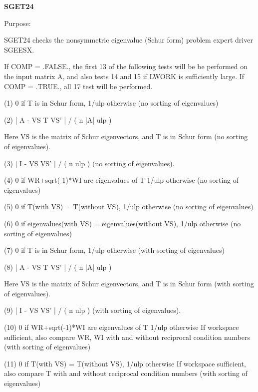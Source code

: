 {\bfseries S\+G\+E\+T24} 

\begin{DoxyParagraph}{Purpose\+: }
\begin{DoxyVerb}    SGET24 checks the nonsymmetric eigenvalue (Schur form) problem
    expert driver SGEESX.

    If COMP = .FALSE., the first 13 of the following tests will be
    be performed on the input matrix A, and also tests 14 and 15
    if LWORK is sufficiently large.
    If COMP = .TRUE., all 17 test will be performed.

    (1)     0 if T is in Schur form, 1/ulp otherwise
           (no sorting of eigenvalues)

    (2)     | A - VS T VS' | / ( n |A| ulp )

      Here VS is the matrix of Schur eigenvectors, and T is in Schur
      form  (no sorting of eigenvalues).

    (3)     | I - VS VS' | / ( n ulp ) (no sorting of eigenvalues).

    (4)     0     if WR+sqrt(-1)*WI are eigenvalues of T
            1/ulp otherwise
            (no sorting of eigenvalues)

    (5)     0     if T(with VS) = T(without VS),
            1/ulp otherwise
            (no sorting of eigenvalues)

    (6)     0     if eigenvalues(with VS) = eigenvalues(without VS),
            1/ulp otherwise
            (no sorting of eigenvalues)

    (7)     0 if T is in Schur form, 1/ulp otherwise
            (with sorting of eigenvalues)

    (8)     | A - VS T VS' | / ( n |A| ulp )

      Here VS is the matrix of Schur eigenvectors, and T is in Schur
      form  (with sorting of eigenvalues).

    (9)     | I - VS VS' | / ( n ulp ) (with sorting of eigenvalues).

    (10)    0     if WR+sqrt(-1)*WI are eigenvalues of T
            1/ulp otherwise
            If workspace sufficient, also compare WR, WI with and
            without reciprocal condition numbers
            (with sorting of eigenvalues)

    (11)    0     if T(with VS) = T(without VS),
            1/ulp otherwise
            If workspace sufficient, also compare T with and without
            reciprocal condition numbers
            (with sorting of eigenvalues)


\end{DoxyVerb}
\end{DoxyParagraph}
